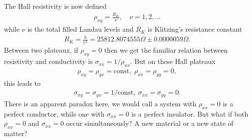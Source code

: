 The Hall resistivity is now defined
\begin{gather}
	\rho_{xy} = \frac{R_{K}}{\nu}, \quad \nu = 1,2,...
\end{gather}
while $\nu$ is the total filled Landau levels and $R_{K}$ is Klitzing's resistance constant
\begin{gather}
	R_{K} = \frac{h}{e^{2}} = 25812.8074555 \Omega \pm 0.0000059 \Omega.
\end{gather}
Between two plateaux, if $\rho_{xy}  = 0$ then we get the familiar relation between resistivity and conductivity is $\sigma_{xx} = 1/\rho_{xx}$. But on these Hall plateaux
\begin{gather}
	\rho_{xy} = \rho_{yx} = \text{const} ,\; \rho_{xx} = \rho_{yy} = 0 ,
\end{gather}
this leads to
\begin{gather}
	\sigma_{xy} = \sigma_{yx} = 1 / \text{const} , \; \sigma_{xx} = \sigma_{yy} = 0.
\end{gather}
There is an apparent paradox here, we would call a system with $\rho_{xx} = 0$ is a perfect conductor, while one with $\sigma_{xx} = 0$ is a perfect insulator. But what if both $\rho_{xx} = 0$ and $\sigma_{xx} = 0$ occur simultaneously? A new material or a new state of matter?





